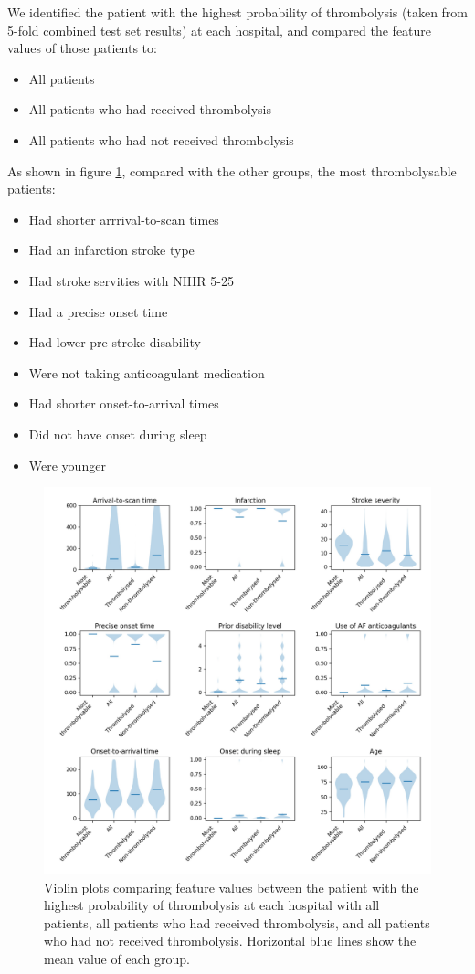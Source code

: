 We identified the patient with the highest probability of thrombolysis (taken from 5-fold combined test set results) at each hospital, and compared the feature values of those patients to:

\begin{itemize}
\item All patients
\item All patients who had received thrombolysis
\item All patients who had not received thrombolysis
\end{itemize}

As shown in figure \ref{fig:most_thrombolysable}, compared with the other groups, the most thrombolysable patients:
\begin{itemize}
\item Had shorter arrrival-to-scan times
\item Had an infarction stroke type
\item Had stroke servities with NIHR 5-25
\item Had a precise onset time
\item Had lower pre-stroke disability
\item Were not taking anticoagulant medication
\item Had shorter onset-to-arrival times
\item Did not have onset during sleep
\item Were younger
\end{itemize}

\begin{figure}
\centering
\includegraphics[width=1\textwidth]{./images/02a_most_thrombolsyable_violin}
\caption{Violin plots comparing feature values between the patient with the highest probability of thrombolysis at each hospital with all patients, all patients who had received thrombolysis, and all patients who had not received thrombolysis. Horizontal blue lines show the mean value of each group.}
\label{fig:most_thrombolysable}
\end{figure}

